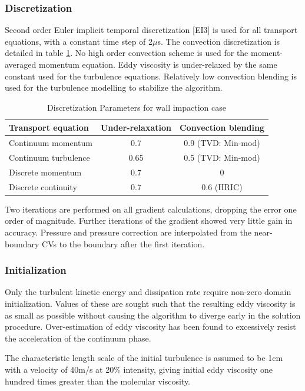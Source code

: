 \documentclass[a4paper,10pt]{article}
\begin{document}
\subsubsection{Discretization}
Second order Euler implicit temporal discretization [EI3] is used for all transport equations, with a constant time step of 2$\mu$s. The convection discretization is detailed in table \ref{tab:desc_para}. No high order convection scheme is used for the moment-averaged momentum equation. Eddy viscosity is under-relaxed by the same constant used for the turbulence equations. Relatively low convection blending is used for the turbulence modelling to stabilize the algorithm.
\begin{table}[H]
\caption{Discretization Parameters for wall impaction case}
\vspace{2mm}
\centering
\begin{tabular}{l | c c}
\hline \hline
Transport equation & Under-relaxation & Convection blending \\
\hline
Continuum momentum & 0.7 & 0.9 (TVD: Min-mod) \\
Continuum turbulence & 0.65 & 0.5 (TVD: Min-mod) \\
Discrete momentum & 0.7 & 0 \\
Discrete continuity & 0.7 & 0.6 (HRIC) \\
\end{tabular}
\label{tab:desc_para}
\end{table}

Two iterations are performed on all gradient calculations, dropping the error one order of magnitude. Further iterations of the gradient showed very little gain in accuracy. Pressure and pressure correction are interpolated from the near-boundary CVs to the boundary after the first iteration.



\subsubsection{Initialization}
Only the turbulent kinetic energy and dissipation rate require non-zero domain initialization. Values of these are sought such that the resulting eddy viscosity is as small as possible without causing the algorithm to diverge early in the solution procedure. Over-estimation of eddy viscosity has been found to excessively resist the acceleration of the continuum phase.

The characteristic length scale of the initial turbulence is assumed to be 1cm with a velocity of 40m/s at 20\% intensity, giving initial eddy viscosity one hundred times greater than the molecular viscosity.
\end{document}
